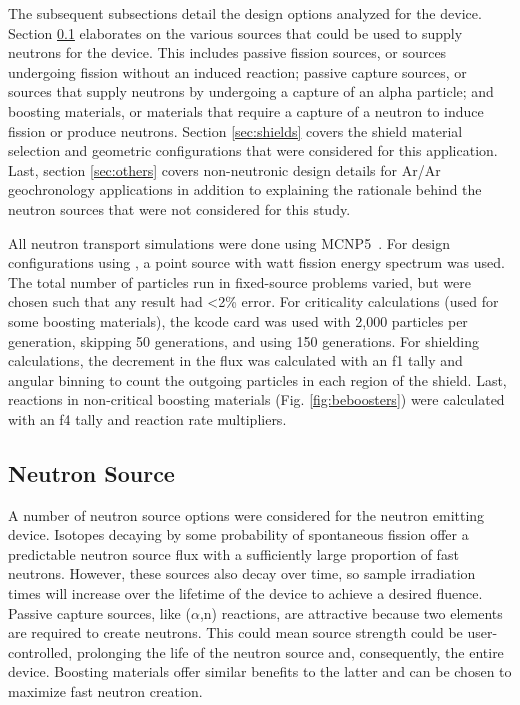 \documentclass{mc2015}
\begin{document}
The subsequent subsections detail the design options analyzed for the device. Section \ref{sec:sources} elaborates on the various sources that could be used to supply neutrons for the device. This includes passive fission sources, or sources undergoing fission without an induced reaction; passive capture sources, or sources that supply neutrons by undergoing a capture of an alpha particle; and boosting materials, or materials that require a capture of a neutron to induce fission or produce neutrons. Section \ref{sec:shields} covers the shield material selection and geometric configurations that were considered for this application. Last, section \ref{sec:others} covers non-neutronic design details for Ar/Ar geochronology applications in addition to explaining the rationale behind the neutron sources that were not considered for this study. 

All neutron transport simulations were done using MCNP5~\cite{brown_mcnp_2002}. For design configurations using , a point source with watt fission energy spectrum was used. The total number of particles run in fixed-source problems varied, but were chosen such that any result had <2\% error. For criticality calculations (used for some boosting materials), the kcode card was used with 2,000 particles per generation, skipping 50 generations, and using 150 generations. For shielding calculations, the decrement in the flux was calculated with an f1 tally and angular binning to count the outgoing particles in each region of the shield.
 Last, reactions in non-critical boosting materials (Fig. \ref{fig:beboosters}) were calculated with an f4 tally and reaction rate multipliers.

\subsection{Neutron Source}
\label{sec:sources}

A number of neutron source options were considered for the neutron emitting device. Isotopes decaying by some probability of spontaneous fission offer a predictable neutron source flux with a sufficiently large proportion of fast neutrons. However, these sources also decay over time, so sample irradiation times will increase over the lifetime of the device to achieve a desired fluence. Passive capture sources, like ($\alpha$,n) reactions, are attractive because two elements are required to create neutrons. This could mean source strength could be user-controlled, prolonging the life of the neutron source and, consequently, the entire device. Boosting materials offer similar benefits to the latter and can be chosen to maximize fast neutron creation. 
\end{document}
